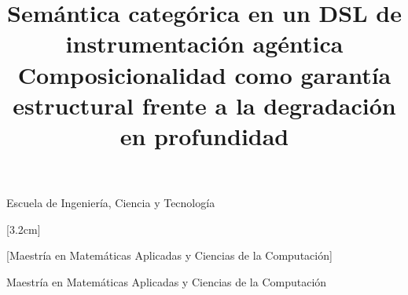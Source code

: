 
\SuppressMonthError                      %
\renewcommand{\abstractname}{Resumen}
\renewcommand{\contentsname}{Índice general}
\renewcommand{\listfigurename}{Índice de figuras}
\renewcommand{\listtablename}{Índice de tablas}
\renewcommand{\refname}{Referencias}
\renewcommand{\bibname}{Referencias}
\renewcommand{\indexname}{Índice alfabético}
\renewcommand{\figurename}{Figura}
\renewcommand{\tablename}{Tabla}
\renewcommand{\chaptername}{Capítulo}
\renewcommand{\appendixname}{Apéndice}

\title{Semántica categórica en un DSL de instrumentación agéntica\\%
      \large Composicionalidad como garantía estructural frente a la degradación en profundidad\\\normalsize
      }


%
       {Escuela de Ingeniería, Ciencia y Tecnología}


[3.2cm]

%
            [Maestría en Matemáticas Aplicadas y Ciencias de la Computación]

%
         {Maestría en Matemáticas Aplicadas y Ciencias de la Computación}


